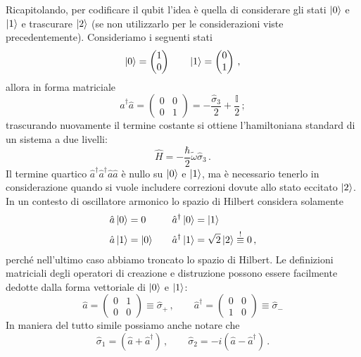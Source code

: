 \noindent Ricapitolando, per codificare il qubit l'idea è quella di considerare gli stati $\ket 0$ e $\ket 1$ e trascurare $\ket 2$ (se non utilizzarlo per le considerazioni viste precedentemente). Consideriamo i seguenti stati
\begin{equation*}
    \ket 0 = \begin{pmatrix}1 \\ 0\end{pmatrix} \qquad \ket 1 = \begin{pmatrix}0 \\ 1 \end{pmatrix} \, ,
\end{equation*}
allora in forma matriciale
\begin{equation*}
    \hat a^\dagger \hat a = \begin{pmatrix}0 & 0 \\ 0 & 1\end{pmatrix}=-\frac{\hat \sigma_3}{2}+\frac{\mathbb{I}}{2} \, ;
\end{equation*}
trascurando nuovamente il termine costante si ottiene l'hamiltoniana standard di un sistema a due livelli:
\begin{equation}\label{usual_H_qubit}
    \hat H = -\frac{\hbar}{2}\tilde{\omega}\hat \sigma_3 \, .
\end{equation}
Il termine quartico $\hat a^\dagger \hat a^\dagger \hat a \hat a$ è nullo su $\ket 0$ e $\ket 1$, ma è necessario tenerlo in considerazione quando si vuole includere correzioni dovute allo stato eccitato $\ket 2$.
In un contesto di oscillatore armonico lo spazio di Hilbert considera solamente
\begin{align*}
    \hat a \ket 0 &= 0 \quad &\hat a^\dagger\ket 0 &= \ket 1 \\
    \hat a \ket 1 &= \ket 0 \quad &\hat a^\dagger \ket 1 &= \sqrt 2 \ket 2 \overset{!}{\equiv}0 \, ,
\end{align*}
perché nell'ultimo caso abbiamo troncato lo spazio di Hilbert. Le definizioni matriciali degli operatori di creazione e distruzione possono essere facilmente dedotte dalla forma vettoriale di $\ket{0}$ e $\ket{1}$:
\begin{equation}\label{a_adag_matrices}
    \hat a =\begin{pmatrix}0 & 1 \\ 0 & 0\end{pmatrix} \equiv \hat \sigma_+ \, , \qquad \hat a^\dagger = \begin{pmatrix}0 & 0 \\ 1 & 0\end{pmatrix} \equiv \hat \sigma_-
\end{equation}
In maniera del tutto simile possiamo anche notare che 
\begin{equation}\label{sigma12_aadag}
    \hat \sigma_1=\left(\hat a + \hat a^\dagger\right) \, , \qquad \hat \sigma_2=-i\left(\hat a - \hat a^\dagger\right) \, .
\end{equation}

